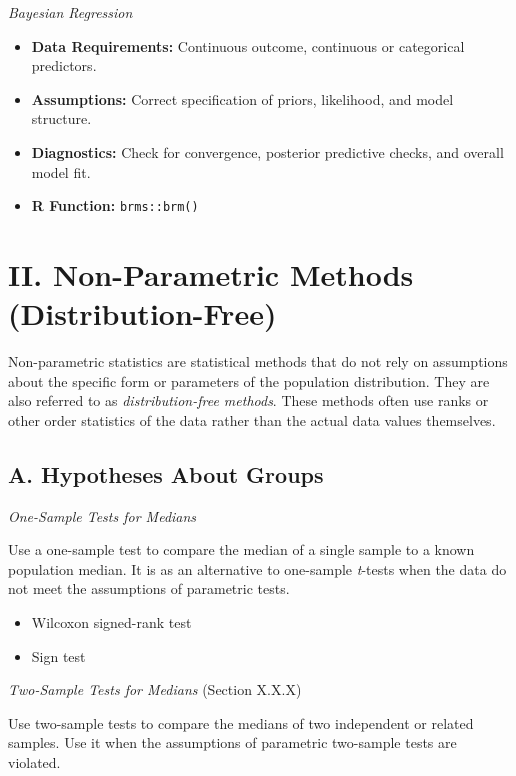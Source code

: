 \documentclass[
  letterpaper,
]{book}
\providecommand{\tightlist}{%
  \setlength{\itemsep}{0pt}\setlength{\parskip}{0pt}}\usepackage{longtable,booktabs,array}
\begin{document}
\emph{Bayesian Regression}

\begin{itemize}
\tightlist
\item
  \textbf{Data Requirements:} Continuous outcome, continuous or
  categorical predictors.
\item
  \textbf{Assumptions:} Correct specification of priors, likelihood, and
  model structure.
\item
  \textbf{Diagnostics:} Check for convergence, posterior predictive
  checks, and overall model fit.
\item
  \textbf{R Function:} \texttt{brms::brm()}
\end{itemize}

\section{II. Non-Parametric Methods
(Distribution-Free)}\label{ii.-non-parametric-methods-distribution-free}

Non-parametric statistics are statistical methods that do not rely on
assumptions about the specific form or parameters of the population
distribution. They are also referred to as \emph{distribution-free
methods}. These methods often use ranks or other order statistics of the
data rather than the actual data values themselves.

\subsection{A. Hypotheses About
Groups}\label{a.-hypotheses-about-groups}

\emph{One-Sample Tests for Medians}

Use a one-sample test to compare the median of a single sample to a
known population median. It is as an alternative to one-sample
\emph{t}-tests when the data do not meet the assumptions of parametric
tests.

\begin{itemize}
\tightlist
\item
  Wilcoxon signed-rank test
\item
  Sign test
\end{itemize}

\emph{Two-Sample Tests for Medians} (Section X.X.X)

Use two-sample tests to compare the medians of two independent or
related samples. Use it when the assumptions of parametric two-sample
tests are violated.
\end{document}

